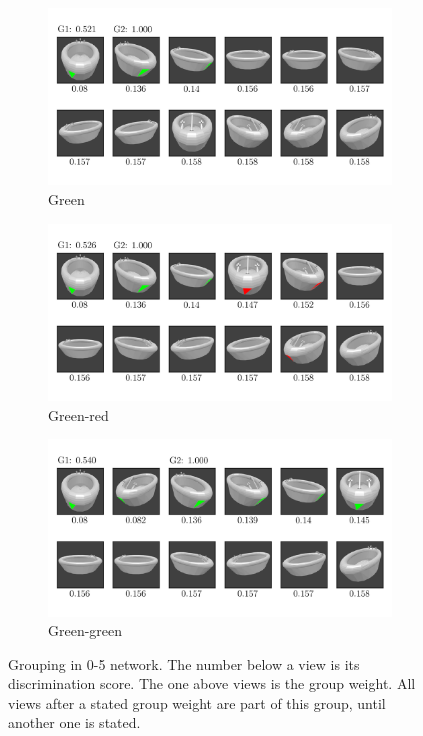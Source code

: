 \begin{figure}
	\centering
	\begin{subfigure}{\textwidth}
		\includegraphics[trim=10 20 10 20, clip]{images/mn-sl-0-5-20/bathtub_0107_1_grouping.png}
		\caption{Green}
		\label{fig:grouping-0-5-green}
	\end{subfigure}
	\begin{subfigure}{\textwidth}
		\includegraphics[trim=10 20 10 20, clip]{images/mn-sl-0-5-20/bathtub_0107_3_grouping.png}
		\caption{Green-red}
		\label{fig:grouping-0-5-green-red}
	\end{subfigure}
	\begin{subfigure}{\textwidth}
		\includegraphics[trim=10 20 10 20, clip]{images/mn-sl-0-5-20/bathtub_0107_4_grouping.png}
		\caption{Green-green}
		\label{fig:grouping-0-5-green-green}
	\end{subfigure}
	\caption[Grouping in 0-5 network]{Grouping in 0-5 network. The number below a view is its discrimination score. The one above views is the group weight. All views after a stated group weight are part of this group, until another one is stated.}
	\label{fig:grouping-0-5}
\end{figure}


